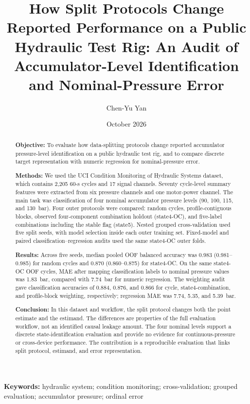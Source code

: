 \documentclass[11pt,a4paper]{article}
\title{How Split Protocols Change Reported Performance on a Public Hydraulic Test Rig: An Audit of Accumulator-Level Identification and Nominal-Pressure Error}
\author{Chen-Yu Yan}
\date{October 2026}
\begin{document}
\maketitle

\begin{abstract}
\sloppy
\textbf{Objective:} To evaluate how data-splitting protocols change reported accumulator pressure-level identification on a public hydraulic test rig, and to compare discrete target representation with numeric regression for nominal-pressure error.

\textbf{Methods:} We used the UCI Condition Monitoring of Hydraulic Systems dataset, which contains 2,205 60-s cycles and 17 signal channels. Seventy cycle-level summary features were extracted from six pressure channels and one motor-power channel. The main task was classification of four nominal accumulator pressure levels (90, 100, 115, and 130~bar). Four outer protocols were compared: random cycles, profile-contiguous blocks, observed four-component combination holdout (state4-OC), and five-label combinations including the stable flag (state5). Nested grouped cross-validation used five split seeds, with model selection inside each outer training set. Fixed-model and paired classification--regression audits used the same state4-OC outer folds.

\textbf{Results:} Across five seeds, median pooled OOF balanced accuracy was 0.983 (0.981--0.985) for random cycles and 0.870 (0.860--0.875) for state4-OC. On the same state4-OC OOF cycles, MAE after mapping classification labels to nominal pressure values was 1.83~bar, compared with 7.74~bar for numeric regression. The weighting audit gave classification accuracies of 0.884, 0.876, and 0.866 for cycle, state4-combination, and profile-block weighting, respectively; regression MAE was 7.74, 5.35, and 5.39~bar.

\textbf{Conclusion:} In this dataset and workflow, the split protocol changes both the point estimate and the estimand. The differences are properties of the full evaluation workflow, not an identified causal leakage amount. The four nominal levels support a discrete state-identification evaluation and provide no evidence for continuous-pressure or cross-device performance. The contribution is a reproducible evaluation that links split protocol, estimand, and error representation.
\end{abstract}

\noindent\textbf{Keywords:} hydraulic system; condition monitoring; cross-validation; grouped evaluation; accumulator pressure; ordinal error
\end{document}
